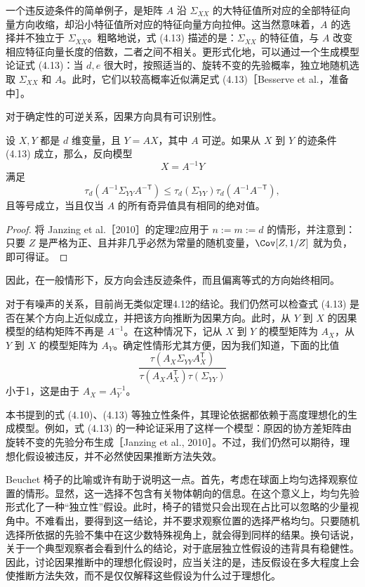 一个违反迹条件的简单例子，是矩阵 $A$ 沿 $\Sigma_{XX}$ 的大特征值所对应的全部特征向量方向收缩，却沿小特征值所对应的特征向量方向拉伸。这当然意味着，$A$ 的选择并不独立于 $\Sigma_{XX}$。粗略地说，式 (4.13) 描述的是：$\Sigma_{XX}$ 的特征值，与 $A$ 改变相应特征向量长度的倍数，二者之间不相关。更形式化地，可以通过一个生成模型论证式 (4.13)：当 $d,e$ 很大时，按照适当的、旋转不变的先验概率，独立地随机选取 $\Sigma_{XX}$ 和 $A$。此时，它们以较高概率近似满足式 (4.13)［Besserve et al.，准备中］。

对于确定性的可逆关系，因果方向具有可识别性。

\begin{theorem}[通过迹条件获得的可识别性]
设 $X,Y$ 都是 $d$ 维变量，且 $Y=AX$，其中 $A$ 可逆。如果从 $X$ 到 $Y$ 的迹条件 (4.13) 成立，那么，反向模型
\[
 X=A^{-1}Y
\]
满足
\[
 \tau_d(A^{-1}\Sigma_{YY}A^{-\mathsf T})
 \leq\tau_d(\Sigma_{YY})\tau_d(A^{-1}A^{-\mathsf T}),
\]
且等号成立，当且仅当 $A$ 的所有奇异值具有相同的绝对值。
\end{theorem}
\begin{proof}
将 Janzing et al.［2010］的定理2应用于 $n:=m:=d$ 的情形，并注意到：只要 $Z$ 是严格为正、且并非几乎必然为常量的随机变量，$\Cov[Z,1/Z]$ 就为负，即可得证。
\end{proof}

因此，在一般情形下，反方向会违反迹条件，而且偏离等式的方向始终相同。

对于有噪声的关系，目前尚无类似定理4.12的结论。我们仍然可以检查式 (4.13) 是否在某个方向上近似成立，并把该方向推断为因果方向。此时，从 $Y$ 到 $X$ 的因果模型的结构矩阵不再是 $A^{-1}$。在这种情况下，记从 $X$ 到 $Y$ 的模型矩阵为 $A_X$，从 $Y$ 到 $X$ 的模型矩阵为 $A_Y$。确定性情形尤其方便，因为我们知道，下面的比值
\[
 \frac{\tau(A_X\Sigma_{YY}A_X^{\mathsf T})}
 {\tau(A_XA_X^{\mathsf T})\tau(\Sigma_{YY})}
\]
小于1，这是由于 $A_X=A_Y^{-1}$。

本书提到的式 (4.10)、(4.13) 等独立性条件，其理论依据都依赖于高度理想化的生成模型。例如，式 (4.13) 的一种论证采用了这样一个模型：原因的协方差矩阵由旋转不变的先验分布生成［Janzing et al., 2010］。不过，我们仍然可以期待，理想化假设被违反，并不必然使因果推断方法失效。

Beuchet 椅子的比喻或许有助于说明这一点。首先，考虑在球面上均匀选择观察位置的情形。显然，这一选择不包含有关物体朝向的信息。在这个意义上，均匀先验形式化了一种“独立性”假设。此时，椅子的错觉只会出现在占比可以忽略的少量视角中。不难看出，要得到这一结论，并不要求观察位置的选择严格均匀。只要随机选择所依据的先验不集中在这少数特殊视角上，就会得到同样的结果。换句话说，关于一个典型观察者会看到什么的结论，对于底层独立性假设的违背具有稳健性。因此，讨论因果推断中的理想化假设时，应当关注的是，违反假设在多大程度上会使推断方法失效，而不是仅仅解释这些假设为什么过于理想化。

